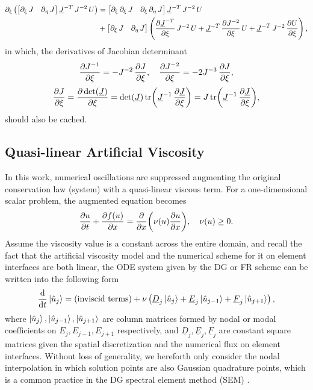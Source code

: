 \documentclass[10pt,draft]{article}
\begin{document}
$$
\begin{aligned}\partial_{\xi}\left(\mathinner{\begin{bmatrix}\partial_{\xi}\,J & \partial_{\eta}\,J\end{bmatrix}}\underline{J}^{-T}\,J^{-2}\,U\right) & =\mathinner{\begin{bmatrix}\partial_{\xi}\,\partial_{\xi}\,J & \partial_{\xi}\,\partial_{\eta}\,J\end{bmatrix}}\underline{J}^{-T}\,J^{-2}\,U\\
 & +\mathinner{\begin{bmatrix}\partial_{\xi}\,J & \partial_{\eta}\,J\end{bmatrix}}\left(\pdv{\underline{J}^{-T}}{\xi}\,J^{-2}\,U+\underline{J}^{-T}\,\pdv{J^{-2}}{\xi}\,U+\underline{J}^{-T}\,J^{-2}\,\pdv{U}{\xi}\right),
\end{aligned}
$$
in which, the derivatives of Jacobian determinant
$$
\pdv{J^{-1}}{\xi}=-J^{-2}\,\pdv{J}{\xi},\quad\pdv{J^{-2}}{\xi}=-2J^{-3}\,\pdv{J}{\xi},
$$
$$
\pdv{J}{\xi}=\pdv{\det(\underline{J})}{\xi}=\det(\underline{J})\tr(\underline{J}^{-1}\,\pdv{\underline{J}}{\xi})=J\tr(\underline{J}^{-1}\,\pdv{\underline{J}}{\xi}),
$$
should also be cached.

\subsection{Quasi-linear Artificial Viscosity}
In this work, numerical oscillations are suppressed augmenting the original conservation law (system) with a quasi-linear viscous term.
For a one-dimensional scalar problem, the augmented equation becomes
$$
\pdv{u}{t}+\pdv{f(u)}{x}=\pdv{x}\qty(\nu(u)\pdv{u}{x}),\quad \nu(u) \ge 0.
$$
%
Assume the viscosity value is a constant across the entire domain,
and recall the fact that the artificial viscosity model and the numerical scheme for it on element interfaces are both linear,
the ODE system given by the DG or FR scheme can be written into the following form
$$
\dv{t}\ket{\hat{u}_{j}}=(\text{inviscid terms})+\nu\left(\underline{D}_{j}\ket{\hat{u}_{j}}+\underline{E}_{j}\ket{\hat{u}_{j-1}}+\underline{F}_{j}\ket{\hat{u}_{j+1}}\right),
$$
where $\ket{\hat{u}_{j}}, \ket{\hat{u}_{j-1}}, \ket{\hat{u}_{j+1}}$ are column matrices formed by nodal or modal coefficients on $E_{j}, E_{j-1}, E_{j+1}$ respectively, and $ \underline{D}_{j}, \underline{E}_{j}, \underline{F}_{j} $ are constant square matrices given the spatial discretization and the numerical flux on element interfaces.
%
Without loss of generality, we hereforth only consider the nodal interpolation in which solution points are also Gaussian quadrature points, which is a common practice in the DG spectral element method (SEM) \cite{Kopriva_2009,Li_2020}.
%
\end{document}
